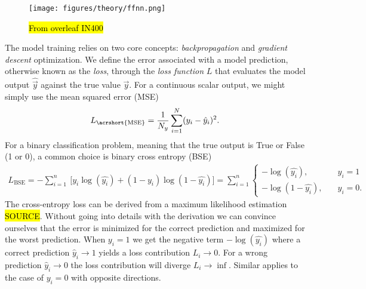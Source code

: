 \begin{figure}[H]
  \centering
  \texttt{[image: figures/theory/ffnn.png]}
  \caption{\hl{From overleaf IN400}}
  \label{fig:ffnn}
\end{figure}


The model training relies on two core concepts: \textit{backpropagation} and \textit{gradient descent} optimization. We define the error associated with a model prediction, otherwise known as the \textit{loss}, through the \textit{loss function} $L$ that evaluates the model output  $\hat{\vec{y}}$ against the true value $\vec{y}$. For a continuous scalar output, we might simply use the mean squared error (\acrshort{MSE})
\begin{align*}
  L_{\text{\acrshort{MSE}}} = \frac{1}{N_y} \sum_{i = 1}^N (y_i - \hat{y}_i)^2.
\end{align*}
For a binary classification problem, meaning that the true output is True or False (1 or 0), a common choice is binary cross entropy (BSE)
\begin{align*}
  L_{\text{BSE}} =  -\sum_{i=1}^n \ \Big[y_i\log(\hat{y_i}) + (1-y_i)\log(1 - \hat{y_i}) \Big] =  \sum_{i=1}^n   \begin{cases}
    - \log{(\hat{y_i})},& \quad y_i = 1 \\
    -\log{(1-\hat{y_i})},& \quad y_i = 0.
\end{cases}
\end{align*}
The cross-entropy loss can be derived from a maximum likelihood estimation \hl{SOURCE}. Without going into details with the derivation we can convince ourselves that the error is minimized for the correct prediction and maximized for the worst prediction. When $y_i = 1$ we get the negative term $-\log(\hat{y_i})$ where a correct prediction $\hat{y}_i \to 1$ yields a loss contribution $L_i \to 0$. For a wrong prediction $\hat{y}_i \to 0$ the loss contribution will diverge $L_i \to \inf$. Similar applies to the case of $y_i = 0$ with opposite directions. 



